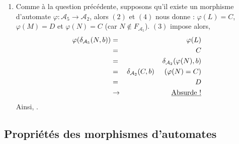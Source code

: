 \documentclass{article}
\begin{document}
\begin{enumerate}
    \item Comme à la question précédente, supposons qu'il existe un morphisme d'automate $\varphi  : \mathcal{A}_5 \rightarrow \mathcal{A}_2$, alors $(2)$ et $(4)$ nous donne : $\varphi(L) = C$, $\varphi(M) = D$ et $\varphi(N) = C$ (car $N \notin F_{\mathcal{A}_5}$). $(3)$ impose alors, 
    \begin{eqnarray*}
        \varphi(\delta_{\mathcal{A}_5}(N, b)) & = & \varphi(L) \\
        & = & C \\
        & = & \delta_{\mathcal{A}_2}(\varphi(N), b) \\
        & = & \delta_{\mathcal{A}_2}(C, b) \hspace{5mm} (\varphi(N) = C) \\
        & = & D \\
        & \rightarrow & \text{\underline{Absurde !}}
    \end{eqnarray*}
    Ainsi, .

\end{enumerate}

\subsection{Propri\'et\'es des morphismes d'automates}
\end{document}
